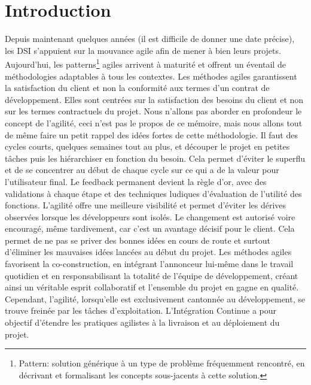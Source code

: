 \documentclass{report}
\begin{document}
    \section{Introduction}
    Depuis maintenant quelques années (il est difficile de donner une date précise), les DSI s’appuient sur la mouvance agile afin de mener à bien leurs projets. Aujourd’hui, les   \gls{pattern}s\footnote{Pattern: solution générique à un type de problème fréquemment rencontré, en décrivant et formalisant les concepts sous-jacents à cette solution.} agiles arrivent à maturité et offrent un éventail de méthodologies adaptables à tous les contextes. Les méthodes agiles garantissent la satisfaction du client et non la conformité aux termes d’un contrat de développement. Elles sont centrées sur la satisfaction des besoins du client et non sur les termes contractuels du projet. Nous n’allons pas aborder en profondeur le concept de l’agilité, ceci n’est pas le propos de ce mémoire, mais nous allons tout de même faire un petit rappel des idées fortes de cette méthodologie. Il faut des cycles courts, quelques semaines tout au plus, et découper le projet en petites tâches puis les hiérarchiser en fonction du besoin. Cela permet d’éviter le superflu et de se concentrer au début de chaque cycle sur ce qui a de la valeur pour l’utilisateur final. Le feedback permanent devient la règle d’or, avec des validations à chaque étape et des techniques ludiques d’évaluation de l’utilité des fonctions. L’agilité offre une meilleure visibilité et permet d’éviter les dérives observées lorsque les développeurs sont isolés. Le changement est autorisé voire encouragé, même tardivement, car c’est un avantage décisif pour le client. Cela permet de ne pas se priver des bonnes idées en cours de route et surtout d’éliminer les mauvaises idées lancées au début du projet. Les méthodes agiles favorisent la co-construction, en intégrant l’annonceur lui-même dans le travail quotidien et en responsabilisant la totalité de l’équipe de développement, créant ainsi un véritable esprit collaboratif et l’ensemble du projet en gagne en qualité.\\

    Cependant, l’agilité, lorsqu’elle est exclusivement cantonnée au développement, se trouve freinée par les tâches d’exploitation. L'Intégration Continue a pour objectif d’étendre les pratiques agilistes à la livraison et au déploiement du projet.
\end{document}
